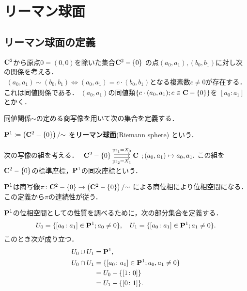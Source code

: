 \section{リーマン球面}
\subsection{リーマン球面の定義}
$\mathbf{C}^{2}$から原点$0=(0,0)$を除いた集合$\mathbf{C}^{2}-\{0\}$
の点$(a_{0},a_{1}), (b_{0},b_{1})$に対し次の関係を考える．
\begin{align}\label{eq:sim1}
    (a_{0},a_{1})\sim (b_{0},b_{1})
    \Longleftrightarrow
    (a_{0},a_{1})= c\cdot(b_{0},b_{1})
    \text{となる複素数}c\neq0\text{が存在する．}
\end{align}
これは同値関係である．
$(a_0,a_1)$の同値類$\{c\cdot(a_0,a_1); c\in\mathbf{C}-\{0\}\}$を
$[a_0\colon a_1]$とかく．

同値関係${\sim}$の定める商写像を用いて次の集合を定義する．

\begin{Definition}
    $\mathbf{P}^{1} \coloneqq \left(\mathbf{C}^{2}-\{0\}\right)/{\sim}$
    を\textbf{リーマン球面}(Riemann sphere) という．
\end{Definition}

\begin{Definition}\label{def:coord1}
    次の写像の組を考える．
    $\begin{tikzcd}
      {\cc^{2}-\{0\}}
        \arrow[r, shift left ,"\pr_1=X_0"]
        \arrow[r, shift right,"\pr_2=X_1"']
      & {\cc}
    \end{tikzcd}; (a_0,a_1)\mapsto a_0,a_1.$
    この組を$\mathbf{C}^{2}-\{0\}$の標準座標，$\mathbf{P}^1$の同次座標という．
\end{Definition}

$\mathbf{P}^{1}$は商写像$\pi \colon \mathbf{C}^{2}-\{0\}
\rightarrow\left(\mathbf{C}^{2}-\{0\}\right)/{\sim}$
による商位相により位相空間になる．この定義から$\pi$の連続性が従う．

$\mathbf{P}^1$の位相空間としての性質を調べるために，次の部分集合を定義する．
\begin{align*}
    U_0=\{[a_0\colon a_1]\in\mathbf{P}^1; a_0\neq0\},\quad
    U_1=\{[a_0\colon a_1]\in\mathbf{P}^1; a_1\neq0\}.
\end{align*}
このとき次が成り立つ．
\begin{align}
    U_0\cup U_1 &= \mathbf{P}^1, \label{eq:cov1}\\
    U_0\cap U_1 
    &= \{[a_0\colon a_1]\in\mathbf{P}^1; a_0, a_1\neq0\} \label{eq:inter-p1}\\
    &= U_0 - \{[1\colon 0]\}  \notag\\
    &= U_1 - \{[0\colon 1]\}. \notag
\end{align}

